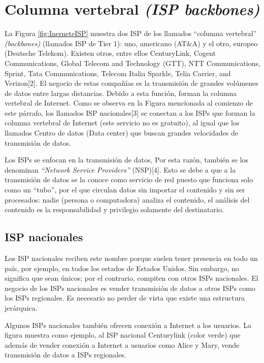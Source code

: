 \documentclass[12pt]{report} %
\begin{document}
\section{Columna vertebral \textit{ (ISP backbones)}}

La Figura \ref{fig:InerneteISP} muestra dos ISP de los llamados “columna vertebral”
 \textit{(backbones)} (llamados ISP de Tier 1): uno, americano (AT\&A) y el otro, europeo (Deutsche Telekom).  Existen otros, entre ellos CenturyLink, Cogent Communications, Global Telecom and Technology (GTT), NTT Communications, Sprint, Tata Communications, Telecom Italia Sparkle, Telia Carrier, and Verizon[2]. El negocio de estas compañías es la transmisión de grandes volúmenes de datos entre largas distancias. Debido a esta función, forman la columna vertebral de Internet. Como se observa en la Figura mencionada al comienzo de este párrafo, los llamados ISP nacionales[3] se conectan a los ISPs que forman la columna vertebral de Internet (este servicio no es gratuito), al igual que los llamados Centro de datos (Data center) que buscan grandes velocidades de transmisión de datos.

Los ISPs se enfocan en la transmisión de datos, Por esta razón, también se los denominan \textit{“Network Service Providers”} (NSP)[4]. Esto se debe a que a la transmisión de datos se la conoce como servicio de red puesto que funciona solo como un “tubo”, por el que circulan datos sin importar el contenido y sin ser procesados: nadie (persona o computadora) analiza el contenido, el análisis del contenido es la responsabilidad y privilegio solamente del destinatario.

\subsection{ISP nacionales}

Los ISP nacionales reciben este nombre porque suelen tener presencia en todo un país, por ejemplo, en todos los estados de Estados Unidos. Sin embargo, no significa que sean únicos; por el contrario, compiten con otros ISPs nacionales. El negocio de los ISPs nacionales es vender transmisión de datos a otros ISPs como los ISPs regionales.  Es necesario no perder de vista que existe una estructura jerárquica.

Algunos ISPs nacionales también ofrecen conexión a Internet a los usuarios. La figura muestra como ejemplo, al ISP nacional Centurylink (color verde) que además de vender conexión a Internet a usuarios como Alice y Mary, vende transmisión de datos a ISPs regionales.
\end{document}
